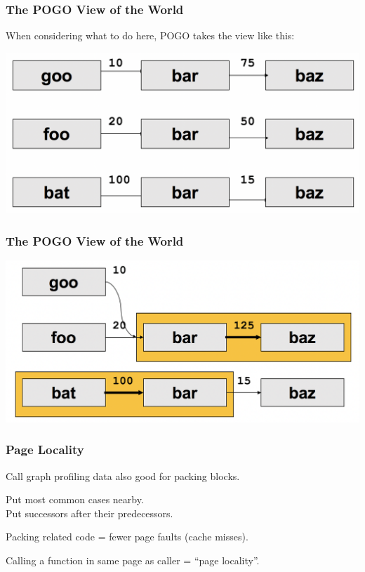 \begin{frame}
\frametitle{The POGO View of the World}
\large
When considering what to do here, POGO takes the view like this:

\begin{center}
	\includegraphics[width=\textwidth]{images/callpaths3.png}
\end{center}

\end{frame}



\begin{frame}
\frametitle{The POGO View of the World}

\begin{center}
	\includegraphics[width=\textwidth]{images/callpaths4.png}
\end{center}

\end{frame}




\begin{frame}
\frametitle{Page Locality}

\large
\begin{changemargin}{1cm}
Call graph profiling data also good for packing blocks.

Put most common cases nearby.\\
Put successors after their predecessors.

Packing related code = fewer page faults (cache misses).

Calling a function in same page as caller =  ``page locality''.
\end{changemargin}

\end{frame}



